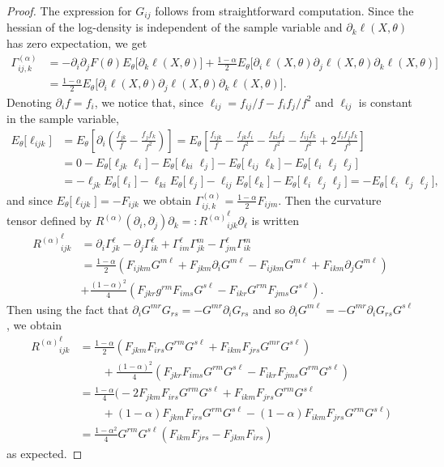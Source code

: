 \documentclass[11pt,reqno]{amsart}
\theoremstyle{definition}
\begin{document}
\begin{proof}
The expression for $G_{ij}$ follows from straightforward computation. Since the hessian of the log-density is independent of the sample variable and $\partial_k\ell(X,\theta)$ has zero expectation, we get
\begin{align*}
\Gamma^{(\alpha)}_{ij,k}&=-\partial_i\partial_jF(\theta)E_\theta\big[\partial_k\ell(X,\theta)\big]+\frac{1-\alpha}{2}E_\theta\big[\partial_i\ell(X,\theta)\partial_j\ell(X,\theta)\partial_k\ell(X,\theta)\big]\\
&=\frac{1-\alpha}{2}E_\theta\big[\partial_i\ell(X,\theta)\partial_j\ell(X,\theta)\partial_k\ell(X,\theta)\big].
\end{align*}
Denoting $\partial_if=f_i$, we notice that, since $\ell_{ij}=f_{ij}/f- f_{i}f_j/f^2$ and $\ell_{ij}$ is constant in the sample variable,
\begin{align*}
E_\theta\big[\ell_{ijk}\big]&=E_\theta\left[\partial_i\left(\frac{f_{jk}}{f}-\frac{f_jf_k}{f^2}\right)\right]=E_\theta\left[\frac{f_{ijk}}{f}-\frac{f_{jk}f_i}{f^2}-\frac{f_{ki}f_j}{f^2}-\frac{f_{ij}f_k}{f^2}+2\frac{f_if_jf_k}{f^3}\right]\\
&=0-E_\theta\big[\ell_{jk}\ell_i\big]-E_\theta\big[\ell_{ki}\ell_j\big]-E_\theta\big[\ell_{ij}\ell_k\big]-E_\theta\big[\ell_i\ell_j\ell_j\big]\\
&=-\ell_{jk}E_\theta\big[\ell_i\big]-\ell_{ki}E_\theta\big[\ell_j\big]-\ell_{ij}E_\theta\big[\ell_k\big]-E_\theta\big[\ell_i\ell_j\ell_j\big]=-E_\theta\big[\ell_i\ell_j\ell_j\big],
\end{align*}
and since $E_\theta\big[\ell_{ijk}\big]=-F_{ijk}$ we obtain $\Gamma_{ij,k}^{(\alpha)}=\frac{1-\alpha}{2}F_{ijm}$. Then the curvature tensor defined by $R^{(\alpha)}(\partial_i,\partial_j)\partial_k=:{R^{(\alpha)}}_{ijk}^\ell \partial_\ell$ is written
\begin{align*}
{R^{(\alpha)}}_{ijk}^\ell&=\partial_i\Gamma_{jk}^\ell -\partial_j\Gamma_{ik}^\ell+\Gamma_{im}^\ell\Gamma_{jk}^m-\Gamma_{jm}^\ell\Gamma_{ik}^m\\
&=\frac{1-\alpha}{2}\left(F_{ijkm}G^{m\ell}+F_{jkm}\partial_iG^{m\ell}-F_{ijkm}G^{m\ell}+F_{ikm}\partial_jG^{m\ell}\right)\\
&+\frac{(1-\alpha)^2}{4}\left(F_{jkr}g^{rm}F_{ims}G^{s\ell}-F_{ikr}G^{rm}F_{jms}G^{s\ell}\right).
\end{align*}
Then using the fact that $\partial_iG^{mr}G_{rs}=-G^{mr}\partial_iG_{rs}$ and so $\partial_iG^{m\ell}=-G^{mr}\partial_iG_{rs}G^{s\ell}$, we obtain
\begin{align*}
{R^{(\alpha)}}_{ijk}^\ell&=\frac{1-\alpha}{2}\left(F_{jkm}F_{irs}G^{rm}G^{s\ell}+F_{ikm}F_{jrs}G^{mr}G^{s\ell}\right)\\&\qquad+\frac{(1-\alpha)^2}{4}\left(F_{jkr}F_{ims}G^{rm}G^{s\ell}-F_{ikr}F_{jms}G^{rm}G^{s\ell}\right)\\
&=\frac{1-\alpha}{4}\bigg(-2F_{jkm}F_{irs}G^{rm}G^{s\ell}+F_{ikm}F_{jrs}G^{rm}G^{s\ell}\\&\qquad+(1-\alpha)F_{jkm}F_{irs}G^{rm}G^{s\ell}-(1-\alpha)F_{ikm}F_{jrs}G^{rm}G^{s\ell}\bigg)\\
&=\frac{1-\alpha^2}{4}G^{rm}G^{s\ell}\left(F_{ikm}F_{jrs}-F_{jkm}F_{irs}\right)
\end{align*}
as expected.
\end{proof}
\end{document}
